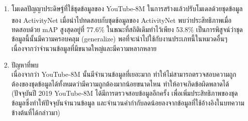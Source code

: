 \begin{enumerate}
\begin{enumerate}
		\item โมเดลปัญญาประดิษฐ์ที่ใช้ชุดข้อมูลของ YouTube-8M ในการสร้างแล้วปรับโมเดลด้วยชุดข้อมูลของ ActivityNet\textsuperscript{\cite{caba2015activitynet}} เมื่อนำไปทดสอบกับชุดข้อมูลของ ActivityNet 
		พบว่าประสิทธิภาพเมื่อทดสอบด้วย mAP สูงสุดอยู่ที่ 77.6\% ในขณะที่สถิติเดิมทำไว้เพียง 53.8\% เป็นการพิสูจน์ว่าชุดข้อมูลนี้นั้นมีความครอบคลุม (generalize) 
		พอที่จะนำไปใช้กับงานประเภทนี้ในหมวดอื่นๆ เนื่องจากว่าจำนวนข้อมูลที่มีขนาดใหญ่และมีความหลากหลาย
		
		\item ปัญหาที่พบ\\
		เนื่องจากว่า YouTube-8M นั้นมีจำนวนข้อมูลที่เยอะมาก ทำให้ไม่สามารถตรวจสอบความถูกต้องของชุดข้อมูลได้ทั้งหมดว่ามีความถูกต้องมากน้อยขนาดไหน 
		ทำให้อาจเกิดข้อผิดพลาดได้ (ปัจจุบันปี 2019 YouTube-8M ได้มีการตรวจสอบข้อมูลอีกครั้ง เพื่อเพิ่มประสิทธิภาพของชุดข้อมูลซึ่งทำให้ปัจจุบันจำนวนข้อมูล 
		และจำนวนคำกำกับลดน้อยลงจากข้อมูลที่ใช้อ้างอิงในบทความข้างต้นที่ได้กล่าวมา)
	\end{enumerate}	
\end{enumerate}